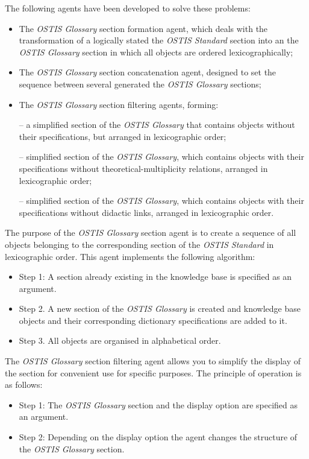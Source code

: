 \documentclass[12pt,a4paper]{scndocument}
\begin{document}
\begin{multicols}{2}
The following agents have been developed to solve these problems:
\begin{itemize}
\item The \textit{OSTIS Glossary} section formation agent, which deals with the transformation of a logically stated the \textit{OSTIS Standard} section into an the \textit{OSTIS Glossary} section in which all objects are ordered lexicographically;
\item The \textit{OSTIS Glossary} section concatenation agent, designed to set the sequence between several generated the \textit{OSTIS Glossary} sections;
\item The \textit{OSTIS Glossary} section filtering agents, forming:
\end{itemize}
\newpage
\begin{itemize}

\item[--] a simplified section of the \textit{OSTIS Glossary} that contains objects without their specifications, but arranged in lexicographic order;
\item[--] simplified section of the \textit{OSTIS Glossary}, which contains objects with their specifications without theoretical-multiplicity relations, arranged in lexicographic order;
\item[--] simplified section of the \textit{OSTIS Glossary}, which contains objects with their specifications without didactic links, arranged in lexicographic order.
\end{itemize}

The purpose of the \textit{OSTIS Glossary} section agent is to create a sequence of all objects belonging to the corresponding section of the \textit{OSTIS Standard} in lexicographic order. This agent implements the following algorithm:
\begin{itemize}
\item Step 1: A section already existing in the knowledge base is specified as an argument.
\item Step 2. A new section of the \textit{OSTIS Glossary} is created and knowledge base objects and their corresponding dictionary specifications are added to it.
\item Step 3. All objects are organised in alphabetical order.
\end{itemize}

The \textit{OSTIS Glossary} section filtering agent allows you to simplify the display of the section for convenient use for specific purposes. The principle of operation is as follows:
\begin{itemize}
\item Step 1: The \textit{OSTIS Glossary} section and the display option are specified as an argument.
\item Step 2: Depending on the display option the agent changes the structure of the \textit{OSTIS Glossary} section.
\end{itemize}


\end{multicols}
\end{document}
